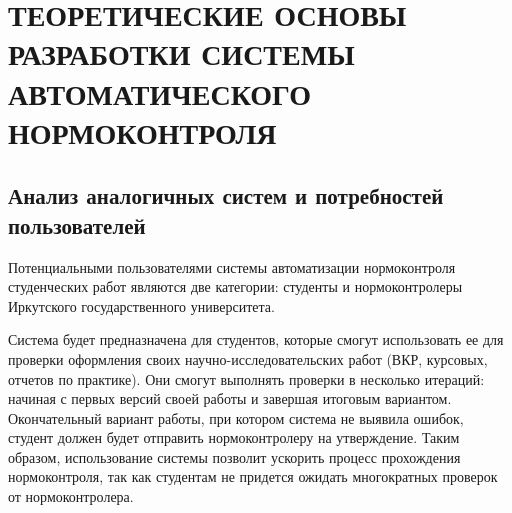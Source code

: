 \documentclass{report}
\begin{document}


\setcounter{section}{0} 
\setcounter{subsection}{0}
\setcounter{equation}{0}

\chapter{ТЕОРЕТИЧЕСКИЕ ОСНОВЫ РАЗРАБОТКИ СИСТЕМЫ АВТОМАТИЧЕСКОГО НОРМОКОНТРОЛЯ}


\section{Анализ аналогичных систем и потребностей пользователей}

Потенциальными пользователями системы автоматизации нормоконтроля студенческих работ являются две категории: студенты и нормоконтролеры Иркутского государственного университета.

Система будет предназначена для студентов, которые смогут использовать ее для проверки оформления своих научно-исследовательских работ (ВКР, курсовых, отчетов по практике). Они смогут выполнять проверки в несколько итераций: начиная с первых версий своей работы и завершая итоговым вариантом. Окончательный вариант работы, при котором система не выявила ошибок, студент должен будет отправить нормоконтролеру на утверждение. Таким образом, использование системы позволит ускорить процесс прохождения нормоконтроля, так как студентам не придется ожидать многократных проверок от нормоконтролера.
\end{document}
